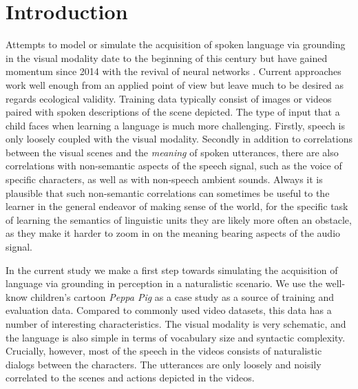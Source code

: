 \section{Introduction}
\label{sec:intro}

Attempts to model or simulate the acquisition of spoken language via
grounding in the visual modality date to the beginning of this century
\citep{roypentland2002learning} but have gained momentum since 2014
with the revival of neural networks
\citep[e.g.][]{synnaeve2014learning,harwath2015deep,
  harwath2016unsupervised,chrupala-etal-2017-representations,alishahi-etal-2017-encoding,harwath2018jointly,Merkx2019,havard2019models,rouditchenko2020avlnet,khorrami_2021,peng2021fastslow}.
Current approaches work well enough from an applied point of view but
leave much to be desired as regards ecological validity. Training data
typically consist of images or videos paired with spoken descriptions
of the scene depicted. The type of input that a child faces when
learning a language is much more challenging.  Firstly, speech is only
loosely coupled with the visual modality. Secondly in addition to
correlations between the visual scenes and the {\it meaning} of spoken
utterances, there are also correlations with non-semantic aspects of
the speech signal, such as the voice of specific characters, as well
as with non-speech ambient sounds. Always it is plausible that such
non-semantic correlations can sometimes be useful to the learner in
the general endeavor of making sense of the world, for the specific
task of learning the semantics of linguistic units they are likely more
often an obstacle, as they make it harder to zoom in on the meaning
bearing aspects of the audio signal.

In the current study we make a first step towards simulating the
acquisition of language via grounding in perception in a naturalistic
scenario.  We use the well-know children's cartoon {\it Peppa Pig} as
a case study as a source of training and evaluation data. Compared to
commonly used video datasets, this data has a number of interesting
characteristics.  The visual modality is very schematic, and the
language is also simple in terms of vocabulary size and syntactic
complexity. Crucially, however, most of the speech in the videos
consists of naturalistic dialogs between the characters. The
utterances are only loosely and noisily correlated to the scenes and
actions depicted in the videos.

